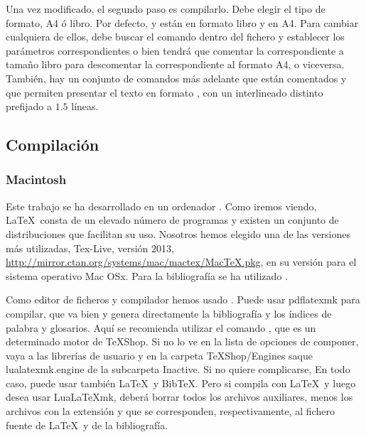 Una vez modificado, el segundo paso es compilarlo. Debe elegir el tipo de formato, A4 ó libro. Por defecto,  y   están en formato libro y  en A4. Para cambiar cualquiera de ellos, debe buscar el comando  dentro del fichero   y establecer los parámetros correspondientes o bien tendrá que comentar la correspondiente a tamaño libro para descomentar la correspondiente al formato A4, o viceversa. También, hay un conjunto de comandos más adelante que están comentados y que permiten presentar el texto en formato , con un interlineado distinto prefijado a $1.5$ líneas. 

\subsection{Compilación}

\subsubsection{{Macintosh}\tsp{\textregistered}}
Este trabajo se ha desarrollado en un ordenador \tsp{\textregistered}. Como iremos viendo, \LaTeX\ consta de un elevado número de programas y existen un conjunto de distribuciones que facilitan su uso. Nosotros hemos elegido una de las versiones más utilizadas, Tex-Live, versión 2013, \url{http://mirror.ctan.org/systems/mac/mactex/MacTeX.pkg}, en su versión para el sistema operativo Mac OSx\tsp{\textregistered}. Para la bibliografía  se ha utilizado . 

Como editor de ficheros y compilador hemos usado \tsp{\textregistered}. Puede usar pdflatexmk para compilar, que va bien y genera directamente la bibliografía y los índices de palabra y glosarios. Aquí se recomienda utilizar el comando , que es un determinado motor  de TeXShop\tsp{\textregistered}. Si no lo ve en la lista de opciones de componer, vaya a las librerías de usuario y en la carpeta TeXShop/Engines saque lualatexmk.engine de la subcarpeta Inactive. Si no quiere complicarse,  En todo caso, puede usar también \LaTeX\ y BibTeX. Pero si compila con \LaTeX\ y luego desea usar Lua\LaTeX mk, deberá borrar todos los archivos auxiliares, menos los archivos con la extensión  y  que se corresponden, respectivamente, al fichero fuente de \LaTeX\ y de la bibliografía.


